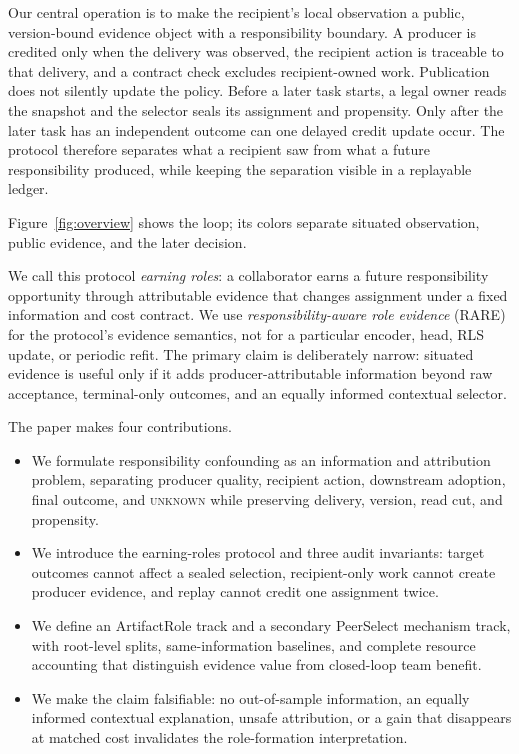 \documentclass[sigconf,anonymous]{aamas}
\newcommand{\unknown}{\textsc{unknown}}
\begin{document}
Our central operation is to make the recipient's local observation a public, version-bound evidence object with a responsibility boundary. A producer is credited only when the delivery was observed, the recipient action is traceable to that delivery, and a contract check excludes recipient-owned work. Publication does not silently update the policy. Before a later task starts, a legal owner reads the snapshot and the selector seals its assignment and propensity. Only after the later task has an independent outcome can one delayed credit update occur. The protocol therefore separates what a recipient saw from what a future responsibility produced, while keeping the separation visible in a replayable ledger.

Figure~\ref{fig:overview} shows the loop; its colors separate situated observation, public evidence, and the later decision.

We call this protocol \emph{earning roles}: a collaborator earns a future responsibility opportunity through attributable evidence that changes assignment under a fixed information and cost contract. We use \emph{responsibility-aware role evidence} (RARE) for the protocol's evidence semantics, not for a particular encoder, head, RLS update, or periodic refit. The primary claim is deliberately narrow: situated evidence is useful only if it adds producer-attributable information beyond raw acceptance, terminal-only outcomes, and an equally informed contextual selector.

The paper makes four contributions.
\begin{itemize}
  \item We formulate responsibility confounding as an information and attribution problem, separating producer quality, recipient action, downstream adoption, final outcome, and \unknown{} while preserving delivery, version, read cut, and propensity.
  \item We introduce the earning-roles protocol and three audit invariants: target outcomes cannot affect a sealed selection, recipient-only work cannot create producer evidence, and replay cannot credit one assignment twice.
  \item We define an ArtifactRole track and a secondary PeerSelect mechanism track, with root-level splits, same-information baselines, and complete resource accounting that distinguish evidence value from closed-loop team benefit.
  \item We make the claim falsifiable: no out-of-sample information, an equally informed contextual explanation, unsafe attribution, or a gain that disappears at matched cost invalidates the role-formation interpretation.
\end{itemize}
\end{document}
